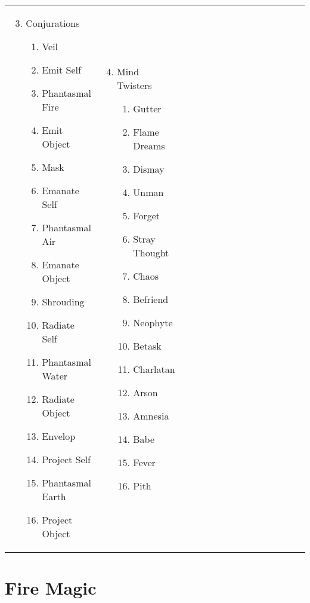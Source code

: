 \begin{tabular}{@{} p{0.25\linewidth} p{0.25\linewidth} p{0.25\linewidth} p{0.25\linewidth}}
\begin{enumerate}
	\setcounter{enumi}{2}
	\item Conjurations
	\begin{enumerate}
		\item Veil
		\item Emit Self
		\item Phantasmal Fire
		\item Emit Object
		\item Mask
		\item Emanate Self
		\item Phantasmal Air
		\item Emanate Object
		\item Shrouding
		\item Radiate Self
		\item Phantasmal Water
		\item Radiate Object
		\item Envelop
		\item Project Self
		\item Phantasmal Earth
		\item Project Object
	\end{enumerate}
\end{enumerate} &
\begin{enumerate}
	\setcounter{enumi}{3}
	\item Mind Twisters
	\begin{enumerate}
		\item Gutter
		\item Flame Dreams
		\item Dismay
		\item Unman
		\item Forget
		\item Stray Thought
		\item Chaos
		\item Befriend
		\item Neophyte
		\item Betask
		\item Charlatan
		\item Arson
		\item Amnesia
		\item Babe
		\item Fever
		\item Pith
	\end{enumerate}
\end{enumerate} \\
\end{tabular}
\pagebreak
\section{Fire Magic}

